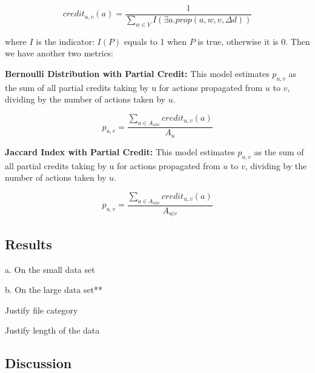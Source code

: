 \begin{equation}
credit_{u,v}(a) = \frac{1}{\sum_{w \in V}I(\exists a. prop(a, w, v, \Delta d))}
\end{equation}

where $I$ is the indicator: $I(P)$ equals to 1 when $P$ is true, otherwise it is 0. Then we have another two metrics:

\textbf{Bernoulli Distribution with Partial Credit:} This model estimates $p_{u,v}$ as the sum of all partial credits taking by u for actions propagated from $u$ to $v$, dividing by the number of actions taken by $u$.

\begin{equation}
p_{u,v} = \frac{\sum_{a\in A_{u2v}}credit_{u,v}(a)}{A_{u}}
\end{equation}

\textbf{Jaccard Index with Partial Credit:} This model estimates $p_{u,v}$ as the sum of all partial credits taking by u for actions propagated from $u$ to $v$, dividing by the number of actions taken by $u$.

\begin{equation}
p_{u,v} = \frac{\sum_{a\in A_{u2v}}credit_{u,v}(a)}{A_{u|v}}
\end{equation}


\subsection{Results}

a. On the small data set

b. On the large data set**

Justify file category

Justify length of the data

\subsection{Discussion}
